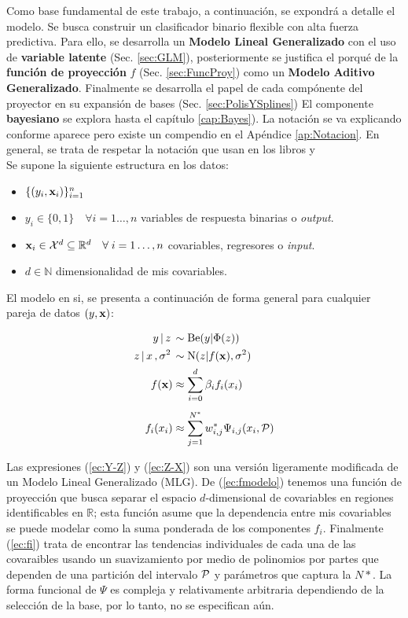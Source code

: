 \documentclass[../Main/Main.tex]{subfiles}
\begin{document}
Como base fundamental de este trabajo, a continuación, se expondrá a detalle el modelo. Se busca construir un clasificador binario flexible con alta fuerza predictiva. Para ello, se desarrolla un \textbf{Modelo Lineal Generalizado} con el uso de \textbf{variable latente} (Sec. \ref{sec:GLM}), posteriormente se justifica el porqué de la \textbf{función de proyección} $f$ (Sec. \ref{sec:FuncProy}) como un \textbf{Modelo Aditivo Generalizado}. Finalmente se desarrolla el papel de cada compónente del proyector en su expansión de bases (Sec. \ref{sec:PolisYSplines}) El componente \textbf{bayesiano} se explora hasta el capítulo \ref{cap:Bayes}). La notación se va explicando conforme aparece pero existe un compendio en el Apéndice \ref{ap:Notacion}. En general, se trata de respetar la notación que usan en los libros \autocite{hastie2008elements} y \autocite{james2013introduction}\\

Se supone la siguiente estructura en los datos:
\begin{itemize}
	\item $\{(y_i,\xni)\}_{i = 1}^n$
	\item $y_i \in \{0,1\}\quad \forall i = 1\ldots,n$  variables de respuesta binarias o \textit{output}.
	\item $\xni \in \mathcal{X}^d \subseteq \mathbb{R}^d \quad \forall \; i = 1\ldots,n$ covariables, regresores o \textit{input}.
	\item $d \in \mathbb{N}$ dimensionalidad de mis covariables.
\end{itemize}

El modelo en si, se presenta a continuación de forma general para cualquier pareja de datos $(y,\xsn)$:

\begin{align}
y\,|\,z\, &\sim \text{Be}(y|\Phi(z)) \label{ec:Y-Z} \\ 
z\,|\,x\,,\sigma^2\, &\sim \text{N}(z|f(\xsn),\sigma^2) \label{ec:Z-X}\\
f(\xsn) &\approx \sum_{i=0}^d \beta_i f_i(x_i) \label{ec:fmodelo} \\[4pt]
f_i(x_i) &\approx \sum_{j = 1}^{N^*} w_{i,j}^* \Psi_{i,j}(x_i, \mathcal{P}) \label{ec:fi}
\end{align}	

Las expresiones (\ref{ec:Y-Z}) y (\ref{ec:Z-X}) son una versión ligeramente modificada de un Modelo Lineal Generalizado (MLG). De (\ref{ec:fmodelo}) tenemos una función de proyección que busca separar el espacio $d$-dimensional de covariables en regiones identificables en $\mathbb{R}$; esta función asume que la dependencia entre mis covariables se puede modelar como la suma ponderada de los componentes $f_i$. Finalmente (\ref{ec:fi}) trata de encontrar las tendencias individuales de cada una de las covaraibles usando un suavizamiento por medio de polinomios por partes que dependen de una partición del intervalo $\P$ y parámetros que captura la $N*$. La forma funcional de $\Psi$ es compleja y relativamente arbitraria dependiendo de la selección de la base, por lo tanto, no se especifican aún. \\
\end{document}
